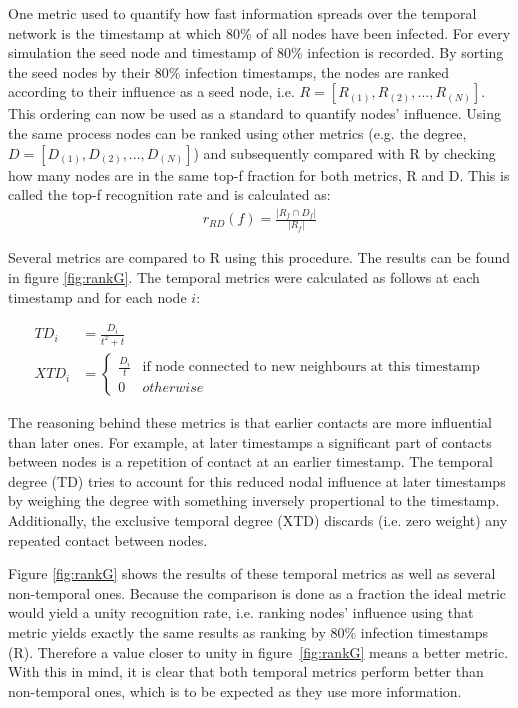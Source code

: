 \documentclass[letterpaper]{article}
\begin{document}
One metric used to quantify how fast information spreads over the temporal network is the timestamp at which 80\% of all nodes have been infected. For every simulation the seed node and timestamp of 80\% infection is recorded. By sorting the seed nodes by their 80\% infection timestamps, the nodes are ranked according to their influence as a seed node, i.e. \(R=[R_{(1)}, R_{(2)}, ..., R_{(N)}]\). This ordering can now be used as a standard to quantify nodes' influence. Using the same process nodes can be ranked using other metrics (e.g. the degree, \(D=[D_{(1)}, D_{(2)}, ..., D_{(N)}]\)) and subsequently compared with R by checking how many nodes are in the same top-f fraction for both metrics, R and D. This is called the top-f recognition rate and is calculated as:
\begin{align*}
	r_{RD}(f) = \frac{\left|R_f \cap D_f\right|}{\left|R_f\right|}
\end{align*}

Several metrics are compared to R using this procedure. The results can be found in figure \ref{fig:rankG}. The temporal metrics were calculated as follows at each timestamp and for each node \(i\):

\begin{align*}
	TD_i &= \frac{D_i}{t^2+t}\\
	XTD_i &= 
		\begin{cases}
		\frac{D_i}{t}& \text{if node connected to new neighbours at this timestamp}\\
		0& otherwise
		\end{cases}
\end{align*}

The reasoning behind these metrics is that earlier contacts are more influential than later ones. For example, at later timestamps a significant part of contacts between nodes is a repetition of contact at an earlier timestamp. The temporal degree (TD) tries to account for this reduced nodal influence at later timestamps by weighing the degree with something inversely propertional to the timestamp. Additionally, the exclusive temporal degree (XTD) discards (i.e. zero weight) any repeated contact between nodes.

Figure \ref{fig:rankG} shows the results of these temporal metrics as well as several non-temporal ones. Because the comparison is done as a fraction the ideal metric would yield a unity recognition rate, i.e. ranking nodes' influence using that metric yields exactly the same results as ranking by 80\% infection timestamps (R). Therefore a value closer to unity in figure~\ref{fig:rankG} means a better metric. With this in mind, it is clear that both temporal metrics perform better than non-temporal ones, which is to be expected as they use more information.
\end{document}
